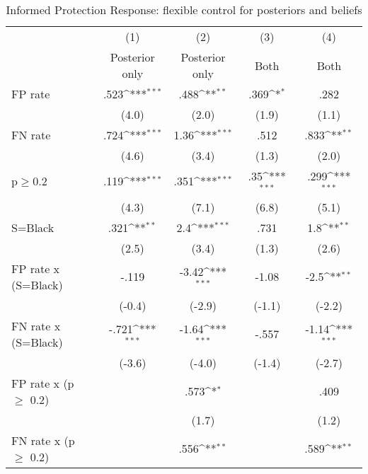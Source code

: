 \begin{table}[htbp]\centering
\def\sym#1{\ifmmode^{#1}\else\(^{#1}\)\fi}
\caption{Informed Protection Response: flexible control for posteriors and beliefs}
\begin{tabular}{l*{4}{c}}
\hline\hline
                &\multicolumn{1}{c}{(1)}&\multicolumn{1}{c}{(2)}&\multicolumn{1}{c}{(3)}&\multicolumn{1}{c}{(4)}\\
                &\multicolumn{1}{c}{Posterior only}&\multicolumn{1}{c}{Posterior only}&\multicolumn{1}{c}{Both}&\multicolumn{1}{c}{Both}\\
\hline
FP rate         &     .523\sym{***}&     .488\sym{**} &     .369\sym{*}  &     .282         \\
                &    (4.0)         &    (2.0)         &    (1.9)         &    (1.1)         \\
FN rate         &     .724\sym{***}&     1.36\sym{***}&     .512         &     .833\sym{**} \\
                &    (4.6)         &    (3.4)         &    (1.3)         &    (2.0)         \\
p$\geq$0.2      &     .119\sym{***}&     .351\sym{***}&      .35\sym{***}&     .299\sym{***}\\
                &    (4.3)         &    (7.1)         &    (6.8)         &    (5.1)         \\
S=Black         &     .321\sym{**} &      2.4\sym{***}&     .731         &      1.8\sym{**} \\
                &    (2.5)         &    (3.4)         &    (1.3)         &    (2.6)         \\
FP rate x (S=Black)&    -.119         &    -3.42\sym{***}&    -1.08         &     -2.5\sym{**} \\
                &   (-0.4)         &   (-2.9)         &   (-1.1)         &   (-2.2)         \\
FN rate x (S=Black)&    -.721\sym{***}&    -1.64\sym{***}&    -.557         &    -1.14\sym{***}\\
                &   (-3.6)         &   (-4.0)         &   (-1.4)         &   (-2.7)         \\
FP rate x (p $\geq$ 0.2)&                  &     .573\sym{*}  &                  &     .409         \\
                &                  &    (1.7)         &                  &    (1.2)         \\
FN rate x (p $\geq$ 0.2)&                  &     .556\sym{**} &                  &     .589\sym{**} \\

\end{tabular}
\end{table}
